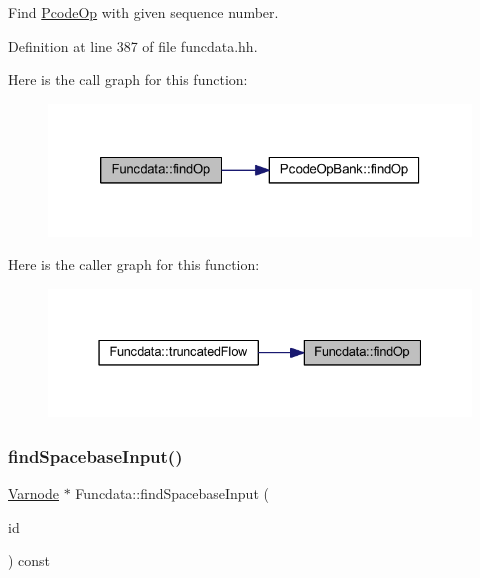 Find \mbox{\hyperlink{class_pcode_op}{Pcode\+Op}} with given sequence number. 



Definition at line 387 of file funcdata.\+hh.

Here is the call graph for this function\+:
\nopagebreak
\begin{figure}[H]
\begin{center}
\leavevmode
\includegraphics[width=320pt]{class_funcdata_a910ebb4d08eba9ee2f68965b6ef0898c_cgraph}
\end{center}
\end{figure}
Here is the caller graph for this function\+:
\nopagebreak
\begin{figure}[H]
\begin{center}
\leavevmode
\includegraphics[width=331pt]{class_funcdata_a910ebb4d08eba9ee2f68965b6ef0898c_icgraph}
\end{center}
\end{figure}
\mbox{\label{class_funcdata_a1eee1ea3fa8e72d17549a936567c97bf}} 
\subsubsection{\texorpdfstring{findSpacebaseInput()}{findSpacebaseInput()}}
{\footnotesize\ttfamily \mbox{\hyperlink{class_varnode}{Varnode}} $\ast$ Funcdata\+::find\+Spacebase\+Input (\begin{DoxyParamCaption}\item[{\mbox{\hyperlink{class_addr_space}{Addr\+Space}} $\ast$}]{id }\end{DoxyParamCaption}) const}

